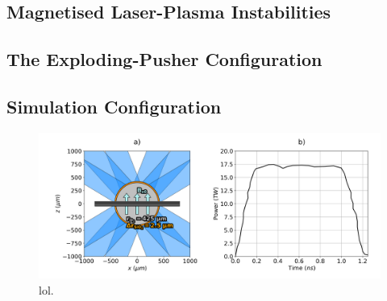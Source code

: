 \subsection{Magnetised Laser-Plasma Instabilities}%
\label{sec:Res2_maglpis}



\subsection{The Exploding-Pusher Configuration}%
\label{sec:Res2_expl}



\subsection{Simulation Configuration}%
\label{sec:Res2_simconfig}


\begin{figure}[t!]
    \includegraphics[width=\linewidth]{Results2/Images/magpdd_diagram_pulse.png}
    \centering
    \caption{lol.}%
    \label{fig:Res2_simconfig}
\end{figure}


